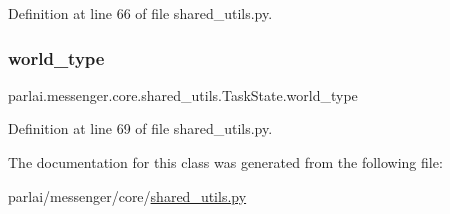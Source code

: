 Definition at line 66 of file shared\+\_\+utils.\+py.

\mbox{\label{classparlai_1_1messenger_1_1core_1_1shared__utils_1_1TaskState_ade4009480c39652af0d07cd86e49f586}} 
\subsubsection{\texorpdfstring{world\+\_\+type}{world\_type}}
{\footnotesize\ttfamily parlai.\+messenger.\+core.\+shared\+\_\+utils.\+Task\+State.\+world\+\_\+type}



Definition at line 69 of file shared\+\_\+utils.\+py.



The documentation for this class was generated from the following file\+:\begin{DoxyCompactItemize}
\item 
parlai/messenger/core/\hyperlink{messenger_2core_2shared__utils_8py}{shared\+\_\+utils.\+py}\end{DoxyCompactItemize}
